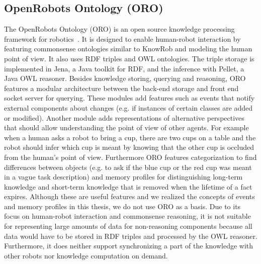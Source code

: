 \subsection{OpenRobots Ontology (ORO)}
\label{sec:oro}
The OpenRobots Ontology (ORO) is an open source knowledge processing
framework for robotics~\cite{Oro}. It is designed to enable
human-robot interaction by featuring commonsense ontologies similar to
KnowRob and modeling the human point of view. It also uses RDF triples
and OWL ontologies.  The triple storage is implemented in Jena, a Java
toolkit for RDF, and the inference with Pellet, a Java OWL
reasoner. Besides knowledge storing, querying and reasoning, ORO
features a modular architecture between the back-end storage and front
end socket server for querying. These modules add features such as
events that notify external components about changes (e.g. if
instances of certain classes are added or modified).
Another module adds representations of alternative perspectives that
should allow understanding the point of view of other agents.
For example when a human asks a robot to bring a
cup, there are two cups on a table and the robot should infer which
cup is meant by knowing that the other cup is occluded from the human's
point of view. Furthermore ORO features categorization to find
differences between objects (e.g. to ask if the blue cup or the red
cup was meant in a vague task description) and memory profiles for
distinguishing long-term knowledge and short-term knowledge that is
removed when the lifetime of a fact expires. Although these are useful
features and we realized the concepts of events and memory
profiles in this thesis, we do not use ORO as a basis. Due to its
focus on human-robot interaction and commonsense reasoning, it is not
suitable for representing large amounts of data for non-reasoning
components because all data would have to be stored in RDF triples and
processed by the OWL reasoner. Furthermore, it does neither support
synchronizing a part of the knowledge with other robots nor knowledge
computation on demand.

